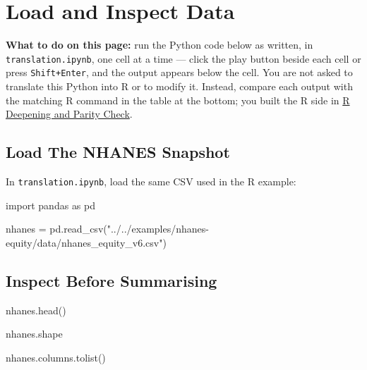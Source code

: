 \documentclass[
  letterpaper,
  DIV=11,
  numbers=noendperiod,
  oneside]{scrreprt}
\newenvironment{Shaded}{\begin{snugshade}}{\end{snugshade}}
\newcommand{\ImportTok}[1]{\textcolor[rgb]{0.00,0.46,0.62}{#1}}
\newcommand{\NormalTok}[1]{\textcolor[rgb]{0.00,0.23,0.31}{#1}}
\newcommand{\OperatorTok}[1]{\textcolor[rgb]{0.37,0.37,0.37}{#1}}
\newcommand{\StringTok}[1]{\textcolor[rgb]{0.13,0.47,0.30}{#1}}
\begin{document}
\chapter{Load and Inspect Data}\label{load-and-inspect-data}

\textbf{What to do on this page:} run the Python code below as written,
in \texttt{translation.ipynb}, one cell at a time --- click the play
button beside each cell or press \texttt{Shift+Enter}, and the output
appears below the cell. You are not asked to translate this Python into
R or to modify it. Instead, compare each output with the matching R
command in the table at the bottom; you built the R side in
\hyperref[r-deepening-and-parity-check]{R Deepening and Parity Check}.

\section{Load The NHANES Snapshot}\label{load-the-nhanes-snapshot}

In \texttt{translation.ipynb}, load the same CSV used in the R example:

\begin{Shaded}
\begin{Highlighting}[numbers=left,,]
\ImportTok{import}\NormalTok{ pandas }\ImportTok{as}\NormalTok{ pd}

\NormalTok{nhanes }\OperatorTok{=}\NormalTok{ pd.read\_csv(}\StringTok{"../../examples/nhanes{-}equity/data/nhanes\_equity\_v6.csv"}\NormalTok{)}
\end{Highlighting}
\end{Shaded}

\section{Inspect Before Summarising}\label{inspect-before-summarising}

\begin{Shaded}
\begin{Highlighting}[numbers=left,,]
\NormalTok{nhanes.head()}
\end{Highlighting}
\end{Shaded}

\begin{Shaded}
\begin{Highlighting}[numbers=left,,]
\NormalTok{nhanes.shape}
\end{Highlighting}
\end{Shaded}

\begin{Shaded}
\begin{Highlighting}[numbers=left,,]
\NormalTok{nhanes.columns.tolist()}
\end{Highlighting}
\end{Shaded}
\end{document}
